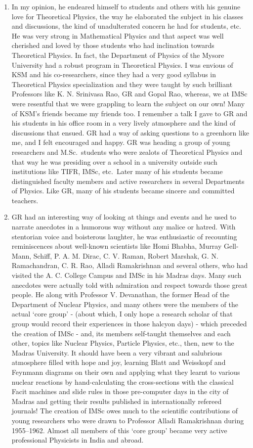 \begin{enumerate}
\itemsep=0pt
\item In my opinion, he endeared himself to students and others with his genuine love for Theoretical Physics, the way he elaborated the subject in his classes and discussions, the kind of unadulterated concern he had for students, etc. He was very strong in Mathematical Physics and that aspect was well cherished and loved by those students who had inclination towards Theoretical Physics. In fact, the Department of Physics of the Mysore University had a robust program in Theoretical Physics. I was envious of KSM and his co-researchers, since they had a very good syllabus in Theoretical Physics specialization and they were taught by such brilliant Professors like K. N. Srinivasa Rao, GR and Gopal Rao, whereas, we at IMSc were resentful that we were grappling to learn the subject on our own! Many of KSM's friends became my friends too. I remember a talk I gave to GR and his students in his office room in a very lively atmosphere and the kind of discussions that ensued. GR had a way of asking questions to a greenhorn like me, and I felt encouraged and happy. GR was heading a group of young researchers and M.Sc.\ students who were zealots of Theoretical Physics and that way he was presiding over a school in a university outside such institutions like TIFR, IMSc, etc.\ Later many of his students became distinguished faculty members and active researchers in several Departments of Physics. Like GR, many of his students became sincere and committed teachers.
\item GR had an interesting way of looking at things and events and he used to narrate anecdotes in a humorous way without any malice or hatred. With stentorian voice and boisterous laughter, he was enthusiastic of recounting reminiscences about well-known scientists like Homi Bhabha, Murray Gell-Mann, Schiff, P. A. M. Dirac, C. V. Raman, Robert Marshak, G. N. Ramachandran, C. R. Rao, Alladi Ramakrishnan and several others, who had visited the A. C. College Campus and IMSc in his Madras days. Many such anecdotes were actually told with admiration and respect towards those great people. He along with Professor V. Devanathan, the former Head of the Department of Nuclear Physics, and many others were the members of the actual `core group' - (about which, I only hope a research scholar of that group would record their experiences in those halcyon days) - which preceded the creation of IMSc - and, its members self-taught themselves and each other, topics like Nuclear Physics, Particle Physics, etc., then, new to the Madras University. It should have been a very vibrant and salubrious atmosphere filled with hope and joy, learning Blatt and Weisskopf and Feynmann diagrams on their own and applying what they learnt to various nuclear reactions by hand-calculating the cross-sections with the classical Facit machines and slide rules in those pre-computer days in the city of Madras and getting their results published in internationally refereed journals! The creation of IMSc owes much to the scientific contributions of young researchers who were drawn to Professor Alladi Ramakrishnan during 1955--1962. Almost all members of this `core group' became very active professional Physicists in India and abroad.

\end{enumerate}
